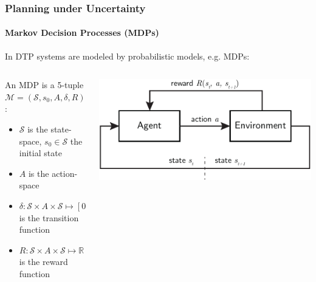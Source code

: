 \begin{frame}
	\frametitle{Planning under Uncertainty}
	\framesubtitle{Markov Decision Processes (MDPs)}
	
	In DTP systems are modeled by probabilistic models, e.g. MDPs:
	\begin{columns}[T]
		\begin{column}{0.6\textwidth}
			\begin{definition}
				An MDP is a 5-tuple $\mathcal{M} = (\mathcal{S}, s_0, A, \delta, R)$:
				\begin{itemize}
					\item $\mathcal{S}$ is the state-space, $s_0 \in \mathcal{S}$ the initial state
					\item $A$ is the action-space
					\item $\delta: \mathcal{S} \times A \times \mathcal{S} \mapsto [0, 1]$ is the transition function %
					\item $R: \mathcal{S} \times A \times \mathcal{S} \mapsto \mathbb{R}$ is the reward function
				\end{itemize}
			\end{definition}
		\end{column}
		\begin{column}{0.425\textwidth}
			\vspace{26pt}
			\includegraphics[width=\linewidth]{figures/mdp-2v2}
		\end{column}
	\end{columns}
\end{frame}


